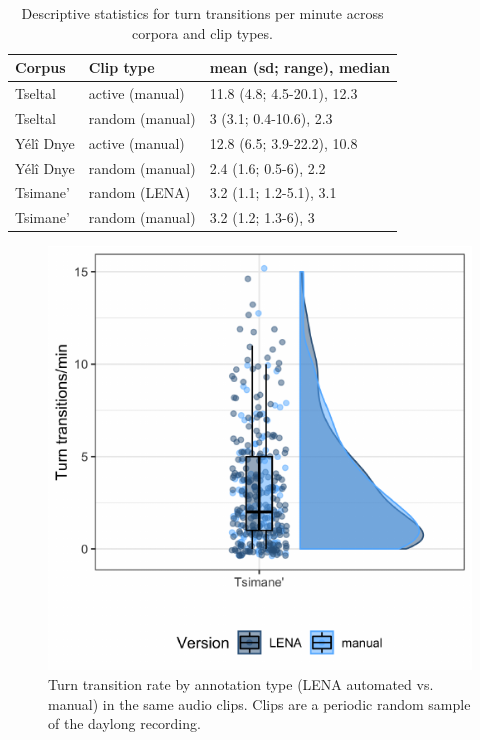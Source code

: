 \documentclass[10pt, letterpaper]{article}
\newenvironment{CodeChunk}{}{}
\begin{document}
\begin{table}[h]
\centering
\begin{tabular}{lll}
  \hline
Corpus & Clip type & mean (sd; range), median \\ 
  \hline
Tseltal & active (manual) & 11.8 (4.8; 4.5-20.1), 12.3 \\ 
  Tseltal & random (manual) & 3 (3.1; 0.4-10.6), 2.3 \\ 
  Yélî Dnye & active (manual) & 12.8 (6.5; 3.9-22.2), 10.8 \\ 
  Yélî Dnye & random (manual) & 2.4 (1.6; 0.5-6), 2.2 \\ 
  Tsimane' & random (LENA) & 3.2 (1.1; 1.2-5.1), 3.1 \\ 
  Tsimane' & random (manual) & 3.2 (1.2; 1.3-6), 3 \\ 
   \hline
\end{tabular}
\caption{Descriptive statistics for turn transitions per minute across corpora and clip types.} 
\end{table}

\begin{CodeChunk}
\begin{figure}[h]

{\centering \includegraphics{figs/tsi.ttr.fig-1} 

}

\caption[Turn transition rate by annotation type (LENA automated vs]{Turn transition rate by annotation type (LENA automated vs. manual) in the same audio clips. Clips are a periodic random sample of the daylong recording.}\label{fig:tsi.ttr.fig}
\end{figure}
\end{CodeChunk}
\end{document}
